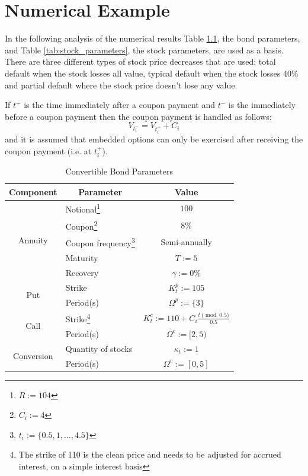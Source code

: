 \documentclass[a4paper,11pt,oneside]{report}
\theoremstyle{plain}
\theoremstyle{definition}
\def\h{\\\hline}
\newcommand{\theader}[1]{\multicolumn{1}{|c|}{\textbf{#1}}}
\def\t{\ensuremath{t}\xspace}
\def\ti{\ensuremath{t_i}\xspace}
\def\T{\ensuremath{T}\xspace}
\def\R{\ensuremath{R}\xspace}
\def\C{\ensuremath{C_i}\xspace}
\def\Kp{\ensuremath{K^{p}_t}\xspace}
\def\Kc{\ensuremath{K^{c}_t}\xspace}
\def\Kv{\ensuremath{\kappa_t}\xspace}
\def\Tp{\ensuremath{\Omega^{p}}\xspace}
\def\Tc{\ensuremath{\Omega^{c}}\xspace}
\def\Tv{\ensuremath{\Omega^{v}}\xspace}
\begin{document}
\chapter{Numerical Example}
In the following analysis of the numerical results Table \ref{tab:bond_parameters}, the bond parameters, and Table \ref{tab:stock_parameters}, the stock parameters, are used as a basis.  There are three different types of stock price decreases that are used: total default when the stock losses all value, typical default when the stock losses 40\% and partial default where the stock price doesn't lose any value.

If $\t^+$ is the time immediately after a coupon payment and $\t^-$ is the immediately before a coupon payment then the coupon payment is handled as follows:
\begin{equation}
 V_{t^{-}_i} = V_{t^{+}_i} + \C
\end{equation}
and it is assumed that embedded options can only be exercised after receiving the coupon payment (i.e. at $t^{+}_i$).

\begin{savenotes}
\begin{table}[ht]
 \centering
 \begin{tabular}{|c|l|c|} \hline
  \theader{Component}         & \theader{Parameter} & \theader{Value} \h
  \multirow{5}{*}{Annuity}    & Notional\footnote{$\R := 104$} & $100$ \\
                              & Coupon\footnote{$\C := 4$} & 8\% \\
                              & Coupon frequency\footnote{$\ti := \{0.5, 1, \ldots, 4.5\}$} & Semi-annually \\
                              & Maturity            & $\T := 5$ \\
                              & Recovery            & $\gamma := 0\%$ \h
  \multirow{2}{*}{Put}        & Strike              & $\Kp := 105$ \\
                              & Period(s)           & $\Tp := \{3\}$ \h
  \multirow{2}{*}{Call}       & Strike\footnote{The strike of 110 is the clean price and needs to be adjusted for accrued interest, on a simple interest basis} & $\Kc := 110 + \C\tfrac{t \pmod {0.5}}{0.5}$ \\
                              & Period(s)           & $\Tc := [2, 5)$ \h
  \multirow{2}{*}{Conversion} & Quantity of stocks  & $\Kv := 1$ \\
                              & Period(s)           & $\Tv := [0, 5]$ \h
 \end{tabular}
 \caption{Convertible Bond Parameters}
 \label{tab:bond_parameters}
\end{table}
\end{savenotes}
\end{document}

